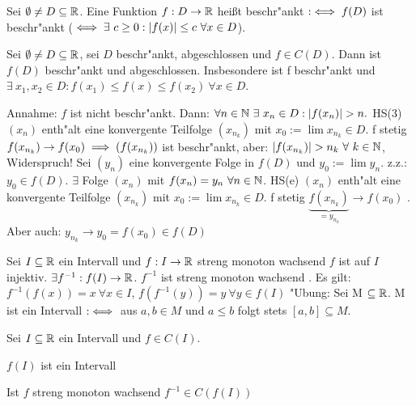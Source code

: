 \documentclass[a4paper,twoside,DIV15,BCOR12mm]{scrbook}
\begin{document}
\begin{definition*}
Sei $\emptyset \ne D \subseteq \mathbb{R}$. Eine Funktion $f: D\to\mathbb{R}$ heißt beschr"ankt $:\iff f(D)$ ist beschr"ankt ($\iff \exists\ c \ge 0 : |f(x)| \le c\ \forall x \in D$).
\end{definition*}

\begin{satz}
Sei $\emptyset \ne D \subseteq \mathbb{R}$, sei $D$ beschr"ankt, abgeschlossen und $f \in C(D)$. Dann ist $f(D)$ beschr"ankt und abgeschlossen. Insbesondere ist f beschr"ankt und $\exists\ x_1, x_2 \in D : f(x_1) \le f(x) \le f(x_2)\ \forall x \in D$.
\end{satz}

\begin{beweis}
Annahme: $f$ ist nicht beschr"ankt. Dann: $\forall n \in \mathbb{N}\ \exists\ x_n \in D: |f(x_n)| > n.$ HS(3) \folgt $(x_n)$ enth"alt eine konvergente Teilfolge $(x_{n_k})$ mit $x_0:=\lim x_{n_k} \in D$. f stetig \folgt $f(x_{n_k}) \to f(x_0) \implies (f(x_{n_k}))$ ist beschr"ankt, aber: $|f(x_{n_k})| > n_k\ \forall\ k \in \mathbb{N}$, Widerspruch! Sei $(y_n)$ eine konvergente Folge in $f(D)$ und $y_0:=\lim y_n$. z.z.: $y_0 \in f(D)$. $\exists$ Folge $(x_n)$ mit $f(x_n)=y_n\ \forall n \in \mathbb{N}$. HS(e) \folgt $(x_n)$ enth"alt eine konvergente Teilfolge $(x_{n_k})$ mit $x_0:=\lim x_{n_k} \in D$. f stetig \folgt $\underbrace{f(x_{n_k})}_{=y_{n_k}} \to f(x_0)$ . Aber auch: $y_{n_k} \to y_0 = f(x_0) \in f(D)$
\end{beweis}

Sei $I \subseteq \mathbb{R}$ ein Intervall und $f: I \to \mathbb{R}$ streng monoton wachsend  \folgt $f$ ist auf $I$ injektiv. \folgt $\exists f^{-1}: f(I) \to \mathbb{R}$. $f^{-1}$ ist streng monoton wachsend . Es gilt: $f^{-1}(f(x)) = x\ \forall x \in I$, $f(f^{-1}(y)) = y\ \forall y \in f(I)$ "Ubung: Sei M $\subseteq \mathbb{R}$. M ist ein Intervall $:\iff$ aus $a, b \in M$ und $a \le b$ folgt stets $[a, b] \subseteq M$.

\begin{satz}
Sei $I \subseteq \mathbb{R}$ ein Intervall und $f \in C(I)$.
\begin{liste}
\item $f(I)$ ist ein Intervall
\item Ist $f$ streng monoton wachsend  \folgt $f^{-1} \in C(f(I))$
\end{liste}
\end{satz}
\end{document}
